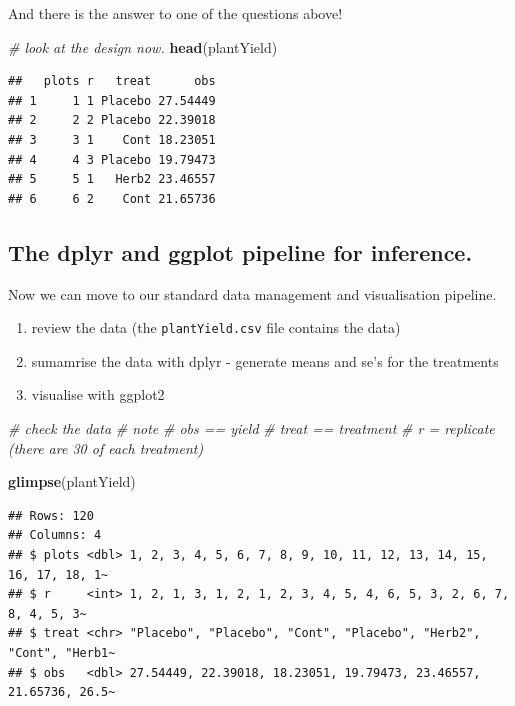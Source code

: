 \documentclass[
]{book}
\newenvironment{Shaded}{\begin{snugshade}}{\end{snugshade}}
\newcommand{\CommentTok}[1]{\textcolor[rgb]{0.56,0.35,0.01}{\textit{#1}}}
\newcommand{\FunctionTok}[1]{\textcolor[rgb]{0.13,0.29,0.53}{\textbf{#1}}}
\newcommand{\NormalTok}[1]{#1}
\providecommand{\tightlist}{%
  \setlength{\itemsep}{0pt}\setlength{\parskip}{0pt}}
\begin{document}
And there is the answer to one of the questions above!

\begin{Shaded}
\begin{Highlighting}[]
\CommentTok{\# look at the design now.}
\FunctionTok{head}\NormalTok{(plantYield)}
\end{Highlighting}
\end{Shaded}

\begin{verbatim}
##   plots r   treat      obs
## 1     1 1 Placebo 27.54449
## 2     2 2 Placebo 22.39018
## 3     3 1    Cont 18.23051
## 4     4 3 Placebo 19.79473
## 5     5 1   Herb2 23.46557
## 6     6 2    Cont 21.65736
\end{verbatim}

\hypertarget{the-dplyr-and-ggplot-pipeline-for-inference.}{%
\subsection{The dplyr and ggplot pipeline for inference.}\label{the-dplyr-and-ggplot-pipeline-for-inference.}}

Now we can move to our standard data management and visualisation pipeline.

\begin{enumerate}
\def\labelenumi{\arabic{enumi}.}
\tightlist
\item
  review the data (the \texttt{plantYield.csv} file contains the data)
\item
  sumamrise the data with dplyr - generate means and se's for the treatments
\item
  visualise with ggplot2
\end{enumerate}

\begin{Shaded}
\begin{Highlighting}[]
\CommentTok{\# check the data}
\CommentTok{\# note}
\CommentTok{\# obs == yield}
\CommentTok{\# treat == treatment}
\CommentTok{\# r = replicate (there are 30 of each treatment)}

\FunctionTok{glimpse}\NormalTok{(plantYield)}
\end{Highlighting}
\end{Shaded}

\begin{verbatim}
## Rows: 120
## Columns: 4
## $ plots <dbl> 1, 2, 3, 4, 5, 6, 7, 8, 9, 10, 11, 12, 13, 14, 15, 16, 17, 18, 1~
## $ r     <int> 1, 2, 1, 3, 1, 2, 1, 2, 3, 4, 5, 4, 6, 5, 3, 2, 6, 7, 8, 4, 5, 3~
## $ treat <chr> "Placebo", "Placebo", "Cont", "Placebo", "Herb2", "Cont", "Herb1~
## $ obs   <dbl> 27.54449, 22.39018, 18.23051, 19.79473, 23.46557, 21.65736, 26.5~
\end{verbatim}
\end{document}
